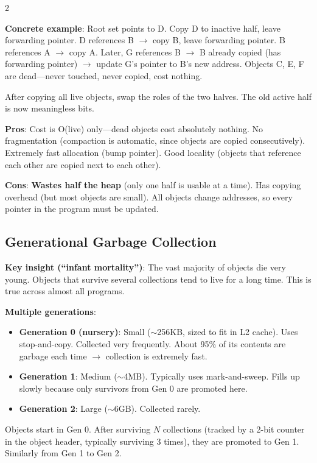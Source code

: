 \documentclass[9pt,landscape]{extarticle}
\begin{document}
\begin{multicols}{2}
\begin{exambox}
\textbf{Concrete example}: Root set points to D. Copy D to inactive half, leave forwarding pointer. D references B $\to$ copy B, leave forwarding pointer. B references A $\to$ copy A. Later, G references B $\to$ B already copied (has forwarding pointer) $\to$ update G's pointer to B's new address. Objects C, E, F are dead---never touched, never copied, cost nothing.

After copying all live objects, swap the roles of the two halves. The old active half is now meaningless bits.
\end{exambox}

\textbf{Pros}: Cost is O(live) only---dead objects cost absolutely nothing. No fragmentation (compaction is automatic, since objects are copied consecutively). Extremely fast allocation (bump pointer). Good locality (objects that reference each other are copied next to each other).

\textbf{Cons}: \textbf{Wastes half the heap} (only one half is usable at a time). Has copying overhead (but most objects are small). All objects change addresses, so every pointer in the program must be updated.

\subsection{Generational Garbage Collection}

\textbf{Key insight (``infant mortality'')}: The vast majority of objects die very young. Objects that survive several collections tend to live for a long time. This is true across almost all programs.

\textbf{Multiple generations}:
\begin{itemize}
  \item \textbf{Generation 0 (nursery)}: Small ($\sim$256KB, sized to fit in L2 cache). Uses stop-and-copy. Collected very frequently. About 95\% of its contents are garbage each time $\to$ collection is extremely fast.
  \item \textbf{Generation 1}: Medium ($\sim$4MB). Typically uses mark-and-sweep. Fills up slowly because only survivors from Gen 0 are promoted here.
  \item \textbf{Generation 2}: Large ($\sim$6GB). Collected rarely.
\end{itemize}

Objects start in Gen 0. After surviving $N$ collections (tracked by a 2-bit counter in the object header, typically surviving 3 times), they are promoted to Gen 1. Similarly from Gen 1 to Gen 2.


\end{multicols}
\end{document}
